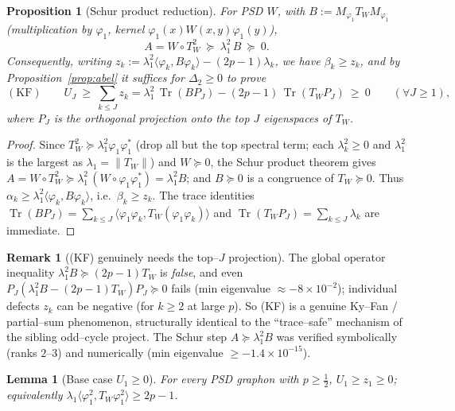 \documentclass[11pt]{article}
\newtheorem{proposition}[theorem]{Proposition}
\newtheorem{lemma}[theorem]{Lemma}
\theoremstyle{definition}
\newtheorem{remark}[theorem]{Remark}
\newcommand{\Tr}{\operatorname{Tr}}
\newcommand{\tw}{T_W}
\begin{document}
\begin{proposition}[Schur product reduction]\label{prop:schur}
For PSD $W$, with $B:=M_{\varphi_1}\tw M_{\varphi_1}$ (multiplication by
$\varphi_1$, kernel $\varphi_1(x)W(x,y)\varphi_1(y)$),
\[
  A=W\circ\tw^2\ \succeq\ \lambda_1^2\,B\ \succeq\ 0 .
\]
Consequently, writing $z_k:=\lambda_1^2\langle\varphi_k,B\varphi_k\rangle-(2p-1)\lambda_k$,
we have $\beta_k\ge z_k$, and by Proposition~\ref{prop:abel} it suffices for
$\Delta_2\ge0$ to prove
\begin{equation}\label{eq:KF}
  (\mathrm{KF})\qquad U_J\ \ge\ \sum_{k\le J}z_k
  =\lambda_1^2\,\Tr(B P_J)-(2p-1)\,\Tr(\tw P_J)\ \ge\ 0\qquad(\forall J\ge1),
\end{equation}
where $P_J$ is the orthogonal projection onto the top $J$ eigenspaces of $\tw$.
\end{proposition}

\begin{proof}
Since $\tw^2\succeq\lambda_1^2\varphi_1\varphi_1^{*}$ (drop all but the top
spectral term; each $\lambda_k^2\ge0$ and $\lambda_1^2$ is the largest as
$\lambda_1=\|\tw\|$) and $W\succeq0$, the Schur product theorem gives
$A=W\circ\tw^2\succeq\lambda_1^2\,(W\circ\varphi_1\varphi_1^{*})=\lambda_1^2 B$;
and $B\succeq0$ is a congruence of $\tw\succeq0$.  Thus
$\alpha_k\ge\lambda_1^2\langle\varphi_k,B\varphi_k\rangle$, i.e.\ $\beta_k\ge z_k$.
The trace identities $\Tr(BP_J)=\sum_{k\le J}\langle\varphi_1\varphi_k,\tw(\varphi_1\varphi_k)\rangle$
and $\Tr(\tw P_J)=\sum_{k\le J}\lambda_k$ are immediate.
\end{proof}

\begin{remark}[(KF) genuinely needs the top--$J$ projection]
The global operator inequality $\lambda_1^2 B\succeq(2p-1)\tw$ is \emph{false},
and even $P_J(\lambda_1^2 B-(2p-1)\tw)P_J\succeq0$ fails (min eigenvalue
$\approx-8\times10^{-2}$); individual defects $z_k$ can be negative (for $k\ge2$
at large $p$).  So (KF) is a genuine Ky--Fan / partial--sum phenomenon,
structurally identical to the ``trace--safe'' mechanism of the sibling
odd--cycle project.  The Schur step $A\succeq\lambda_1^2B$ was verified
symbolically (ranks $2$--$3$) and numerically (min eigenvalue $\ge-1.4\times10^{-15}$).
\end{remark}

\begin{lemma}[Base case $U_1\ge0$]\label{lem:base}
For every PSD graphon with $p\ge\tfrac12$, $U_1\ge z_1\ge0$; equivalently
$\lambda_1\langle\varphi_1^2,\tw\varphi_1^2\rangle\ge2p-1$.
\end{lemma}
\end{document}

